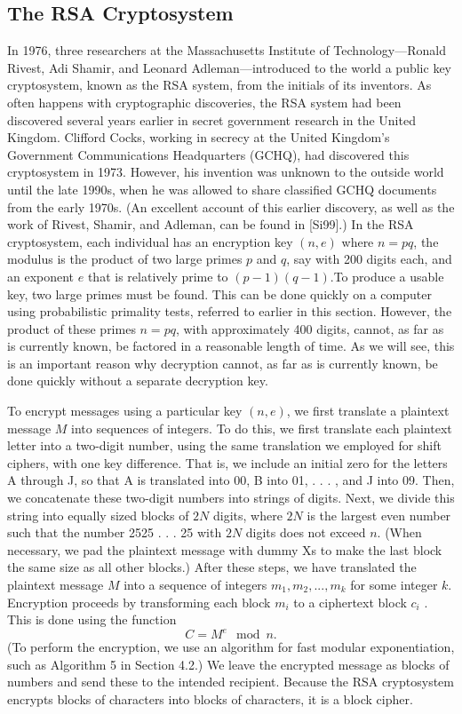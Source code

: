   \subsection {The RSA Cryptosystem}
  In 1976, three researchers at the Massachusetts Institute of Technology—Ronald Rivest, Adi
Shamir, and Leonard Adleman—introduced to the world a public key cryptosystem, known as the
RSA system, from the initials of its inventors. As often happens with cryptographic discoveries,
the RSA system had been discovered several years earlier in secret government research in the
United Kingdom. Clifford Cocks, working in secrecy at the United Kingdom’s Government
Communications Headquarters (GCHQ), had discovered this cryptosystem in 1973. However,
his invention was unknown to the outside world until the late 1990s, when he was allowed to
share classified GCHQ documents from the early 1970s. (An excellent account of this earlier
discovery, as well as the work of Rivest, Shamir, and Adleman, can be found in [Si99].)
In the RSA cryptosystem, each individual has an encryption key $(n, e)$ where $n = pq$, the
modulus is the product of two large primes $p$ and $q$, say with 200 digits each, and an exponent
$e$ that is relatively prime to $(p-1)(q-1)$.To produce a usable key, two large primes must be
found. This can be done quickly on a computer using probabilistic primality tests, referred to
earlier in this section. However, the product of these primes $n = pq$, with approximately 400
digits, cannot, as far as is currently known, be factored in a reasonable length of time. As we
will see, this is an important reason why decryption cannot, as far as is currently known, be
done quickly without a separate decryption key.

To encrypt messages using a particular key $(n, e)$, we first translate a plaintext message $M$
into sequences of integers. To do this, we first translate each plaintext letter into a two-digit
number, using the same translation we employed for shift ciphers, with one key difference.
That is, we include an initial zero for the letters A through J, so that A is translated into 00,
B into 01, . . . , and J into 09. Then, we concatenate these two-digit numbers into strings of digits.
Next, we divide this string into equally sized blocks of $2N$ digits, where $2N$ is the largest even
number such that the number 2525 . . . 25 with $2N$ digits does not exceed $n$. (When necessary,
we pad the plaintext message with dummy Xs to make the last block the same size as all other
blocks.)
After these steps, we have translated the plaintext message $M$ into a sequence of integers
$m_1, m_2, . . . , m_k$ for some integer $k$. Encryption proceeds by transforming each block $m_i$ to a
ciphertext block $c_i$ . This is done using the function
$$C = M^e \mod n.$$
(To perform the encryption, we use an algorithm for fast modular exponentiation, such as
Algorithm 5 in Section 4.2.) We leave the encrypted message as blocks of numbers and send
these to the intended recipient. Because the RSA cryptosystem encrypts blocks of characters
into blocks of characters, it is a block cipher.

